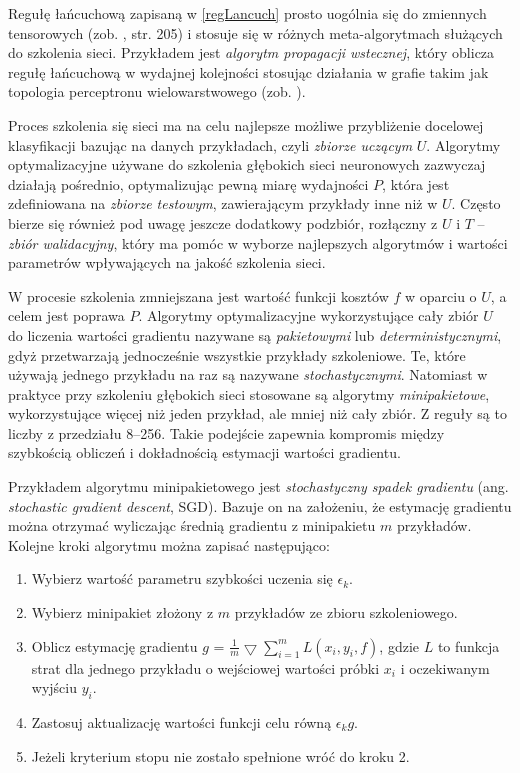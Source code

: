 Regułę łańcuchową zapisaną w \ref{regLancuch} prosto uogólnia się do zmiennych tensorowych (zob. \cite{Goodfellow-et-al-2016}, str. 205) i stosuje się w różnych meta-algorytmach służących do szkolenia sieci. Przykładem jest \textit{algorytm propagacji wstecznej}, który oblicza regułę łańcuchową w wydajnej kolejności stosując działania w grafie takim jak topologia perceptronu wielowarstwowego (zob. \cite{Goodfellow-et-al-2016}).

Proces szkolenia się sieci ma na celu najlepsze możliwe przybliżenie docelowej klasyfikacji bazując na danych przykładach, czyli \textit{zbiorze uczącym} $U$. Algorytmy optymalizacyjne używane do szkolenia głębokich sieci neuronowych zazwyczaj działają pośrednio, optymalizując pewną miarę wydajności $P$, która jest zdefiniowana na \textit{zbiorze testowym}, zawierającym przykłady inne niż w $U$. Często bierze się również pod uwagę jeszcze dodatkowy podzbiór, rozłączny z $U$ i $T$ -- \textit{zbiór walidacyjny}, który ma pomóc w wyborze najlepszych algorytmów i wartości parametrów wpływających na jakość szkolenia sieci.

W procesie szkolenia zmniejszana jest wartość funkcji kosztów $f$ w oparciu o $U$, a celem jest poprawa $P$. Algorytmy optymalizacyjne wykorzystujące cały zbiór $U$ do liczenia wartości gradientu nazywane są \textit{pakietowymi} lub \textit{deterministycznymi}, gdyż przetwarzają jednocześnie wszystkie przykłady szkoleniowe. Te, które używają jednego przykładu na raz są nazywane \textit{stochastycznymi}. Natomiast w praktyce przy szkoleniu głębokich sieci stosowane są algorytmy \textit{minipakietowe}, wykorzystujące więcej niż jeden przykład, ale mniej niż cały zbiór. Z reguły są to liczby z przedziału 8--256. Takie podejście zapewnia kompromis między szybkością obliczeń i dokładnością estymacji wartości gradientu.

Przykładem algorytmu minipakietowego jest \textit{stochastyczny spadek gradientu} (ang. \textit{stochastic gradient descent}, SGD). Bazuje on na założeniu, że estymację gradientu można otrzymać wyliczając średnią gradientu z minipakietu $m$ przykładów. Kolejne kroki algorytmu można zapisać następująco:
\begin{enumerate}
	\item Wybierz wartość parametru szybkości uczenia się $\epsilon_k$.
	\item Wybierz minipakiet złożony z $m$ przykładów ze zbioru szkoleniowego.
	\item Oblicz estymację gradientu $g$ = $\frac{1}{m}\bigtriangledown \sum_{i=1}^{m}L(x_i, y_i, f)$, gdzie $L$ to funkcja strat dla jednego przykładu o wejściowej wartości próbki $x_i$ i oczekiwanym wyjściu $y_i$.
	\item Zastosuj aktualizację wartości funkcji celu równą $\epsilon_k g$.
	\item Jeżeli kryterium stopu nie zostało spełnione wróć do kroku 2. 
\end{enumerate}

